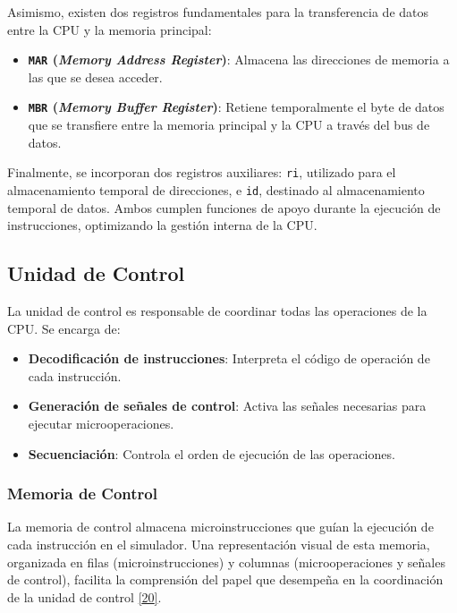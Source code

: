 \documentclass[12pt,oneside]{templates/unerthesis}
\providecommand{\tightlist}{%
  \setlength{\itemsep}{0pt}\setlength{\parskip}{0pt}}
\begin{document}
Asimismo, existen dos registros fundamentales para la transferencia de datos entre la CPU y la memoria principal:

\begin{itemize}
\tightlist
\item
  \textbf{\texttt{MAR} (\emph{Memory Address Register})}: Almacena las direcciones de memoria a las que se desea acceder.\\
\item
  \textbf{\texttt{MBR} (\emph{Memory Buffer Register})}: Retiene temporalmente el byte de datos que se transfiere entre la memoria principal y la CPU a través del bus de datos.
\end{itemize}

Finalmente, se incorporan dos registros auxiliares: \texttt{ri}, utilizado para el almacenamiento temporal de direcciones, e \texttt{id}, destinado al almacenamiento temporal de datos. Ambos cumplen funciones de apoyo durante la ejecución de instrucciones, optimizando la gestión interna de la CPU.

\hypertarget{unidad-de-control}{%
\subsection{Unidad de Control}\label{unidad-de-control}}

La unidad de control es responsable de coordinar todas las operaciones de la CPU. Se encarga de:

\begin{itemize}
\tightlist
\item
  \textbf{Decodificación de instrucciones}: Interpreta el código de operación de cada instrucción.
\item
  \textbf{Generación de señales de control}: Activa las señales necesarias para ejecutar microoperaciones.
\item
  \textbf{Secuenciación}: Controla el orden de ejecución de las operaciones.
\end{itemize}

\hypertarget{memoria-de-control}{%
\subsubsection{Memoria de Control}\label{memoria-de-control}}

La memoria de control almacena microinstrucciones que guían la ejecución de cada instrucción en el simulador. Una representación visual de esta memoria, organizada en filas (microinstrucciones) y columnas (microoperaciones y señales de control), facilita la comprensión del papel que desempeña en la coordinación de la unidad de control \protect\hyperlink{ref-stallings_computer_2021}{{[}20{]}}.
\end{document}
